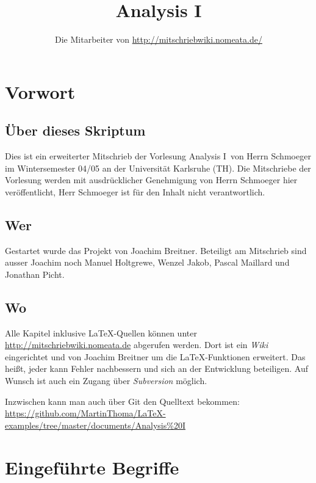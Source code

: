 \documentclass[a4paper,oneside,DIV15,BCOR12mm]{scrbook}
\author{Die Mitarbeiter von \url{http://mitschriebwiki.nomeata.de/}}
\title{Analysis I}
\begin{document}
\maketitle

\renewcommand{\thechapter}{\Roman{chapter}}
\tableofcontents

\chapter{Vorwort}

\section{Über dieses Skriptum}
Dies ist ein erweiterter Mitschrieb der Vorlesung \glqq Analysis I\grqq\ von Herrn Schmoeger im
Wintersemester 04/05 an der Universität Karlsruhe (TH). Die Mitschriebe der Vorlesung werden mit
ausdrücklicher Genehmigung von Herrn Schmoeger hier veröffentlicht, Herr Schmoeger ist für den
Inhalt nicht verantwortlich.

\section{Wer}
Gestartet wurde das Projekt von Joachim Breitner. Beteiligt am Mitschrieb sind ausser Joachim
noch Manuel Holtgrewe, Wenzel Jakob, Pascal Maillard und Jonathan Picht.

\section{Wo}
Alle Kapitel inklusive \LaTeX-Quellen können unter \url{http://mitschriebwiki.nomeata.de} abgerufen werden.
Dort ist ein \emph{Wiki} eingerichtet und von Joachim Breitner um die \LaTeX-Funktionen erweitert.
Das heißt, jeder kann Fehler nachbessern und sich an der Entwicklung
beteiligen. Auf Wunsch ist auch ein Zugang über \emph{Subversion} möglich.

Inzwischen kann man auch über Git den Quelltext bekommen: \url{https://github.com/MartinThoma/LaTeX-examples/tree/master/documents/Analysis\%20I}

\chapter{Eingeführte Begriffe}
\end{document}
